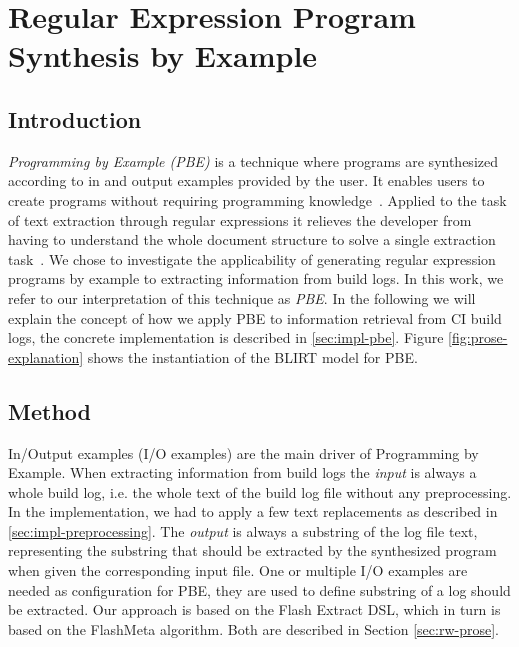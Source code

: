 \documentclass[\myrootdir/main.tex]{subfiles}
\begin{document}
\section{Regular Expression Program Synthesis by Example}
\label{sec:expl-pbe}

\subsection{Introduction}
\emph{Programming by Example (PBE)} is a technique where programs are synthesized according to in and output examples provided by the user.
It enables users to create programs without requiring programming knowledge~\cite{mayer2015user}.
Applied to the task of text extraction through regular expressions it relieves the developer from having to understand the whole document structure to solve a single extraction task~\cite{le2014flashextract:}.
We chose to investigate the applicability of generating regular expression programs by example to extracting information from build logs.
In this work, we refer to our interpretation of this technique as \emph{PBE}.
In the following we will explain the concept of how we apply PBE to information retrieval from CI build logs, the concrete implementation is described in \ref{sec:impl-pbe}.
Figure \ref{fig:prose-explanation} shows the instantiation of the BLIRT model for PBE.

\subsection{Method}
In/Output examples (I/O examples) are the main driver of Programming by Example.
When extracting information from build logs the \emph{input} is always a whole build log, i.e. the whole text of the build log file without any preprocessing.
In the implementation, we had to apply a few text replacements as described in \ref{sec:impl-preprocessing}.
The \emph{output} is always a substring of the log file text, representing the substring that should be extracted by the synthesized program when given the corresponding input file.
One or multiple I/O examples are needed as configuration for PBE, they are used to define substring of a log should be extracted.
Our approach is based on the Flash Extract DSL, which in turn is based on the FlashMeta algorithm.
Both are described in Section \ref{sec:rw-prose}.
\end{document}

